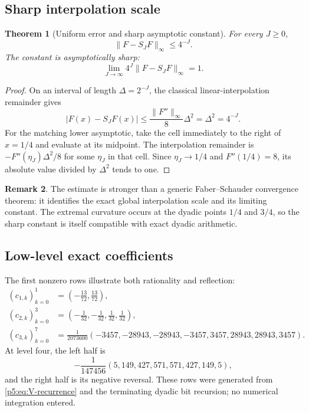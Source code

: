 \documentclass[11pt,oneside]{article}
\newtheorem{theorem}{Theorem}[section]
\theoremstyle{definition}
\newtheorem{remark}[theorem]{Remark}
\begin{document}
\subsection{Sharp interpolation scale}

\begin{theorem}[Uniform error and sharp asymptotic constant]
\label{p5:thm:faber-error}
For every $J\ge0$,
\begin{equation}
 \|F-S_JF\|_\infty\le4^{-J}.                             \label{p5:eq:faber-error-bound}
\end{equation}
The constant is asymptotically sharp:
\begin{equation}
 \boxed{\displaystyle
 \lim_{J\to\infty}4^J\|F-S_JF\|_\infty=1.}              \label{p5:eq:faber-error-limit}
\end{equation}
\end{theorem}

\begin{proof}
On an interval of length $\Delta=2^{-J}$, the classical linear-interpolation
remainder gives
\[
 |F(x)-S_JF(x)|\le\frac{\|F''\|_\infty}{8}\Delta^2
 =\Delta^2=4^{-J}.
\]
For the matching lower asymptotic, take the cell immediately to the right of
$x=1/4$ and evaluate at its midpoint.  The interpolation remainder is
$-F''(\eta_J)\Delta^2/8$ for some $\eta_J$ in that cell.  Since
$\eta_J\to1/4$ and $F''(1/4)=8$, its absolute value divided by $\Delta^2$
tends to one.
\end{proof}

\begin{remark}
The estimate is stronger than a generic Faber--Schauder convergence theorem:
it identifies the exact global interpolation scale and its limiting constant.
The extremal curvature occurs at the dyadic points $1/4$ and $3/4$, so the
sharp constant is itself compatible with exact dyadic arithmetic.
\end{remark}

\subsection{Low-level exact coefficients}

The first nonzero rows illustrate both rationality and reflection:
\begin{align}
 (c_{1,k})_{k=0}^{1}
   &=\left(-\frac{13}{72},\frac{13}{72}\right),          \label{p5:eq:faber-row1}\\
 (c_{2,k})_{k=0}^{3}
   &=\left(-\frac1{32},-\frac1{32},\frac1{32},\frac1{32}\right), \label{p5:eq:faber-row2}\\
 (c_{3,k})_{k=0}^{7}
   &=\frac1{2073600}
     (-3457,-28943,-28943,-3457,3457,28943,28943,3457).  \label{p5:eq:faber-row3}
\end{align}
At level four, the left half is
\begin{equation}
 -\frac1{147456}(5,149,427,571,571,427,149,5),            \label{p5:eq:faber-row4}
\end{equation}
and the right half is its negative reversal.  These rows were generated from
\eqref{p5:eq:V-recurrence} and the terminating dyadic bit recursion; no numerical
integration entered.
\end{document}
